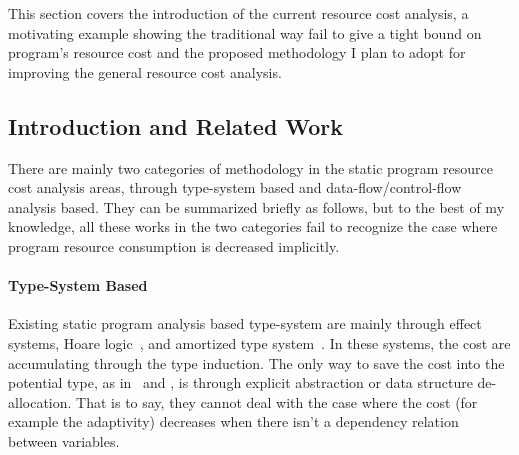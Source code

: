 This section covers the introduction of the current resource cost analysis, a 
motivating example showing the traditional way fail to give a tight bound on program's resource cost 
and the proposed methodology I plan to adopt for improving the general resource cost analysis.
\subsection{Introduction and Related Work}
\label{subsubsec:furthers-cost-backgroung}
There are mainly two categories of methodology in the static program resource cost analysis areas, 
through type-system based  and data-flow/control-flow analysis based. 
They can be summarized briefly as follows, but to the best of my knowledge,
all these works in the two categories fail to recognize the case where program resource consumption is decreased implicitly.
 \paragraph*{Type-System Based}
Existing
static program analysis based type-system are mainly through 
effect systems, 
Hoare logic~\cite{gaboardi2021graded}, and amortized type system~\cite{hoffmann_jost_2022}.
%
In these systems, the cost are accumulating through the type induction. 
The only way to save the cost into the potential
type, as in~\cite{GustafssonEL05} and \cite{hoffmann_jost_2022}, 
is through explicit abstraction or data structure de-allocation.
That is to say, they cannot deal with the case where the cost (for example the adaptivity) decreases when there isn't a dependency relation between variables.
